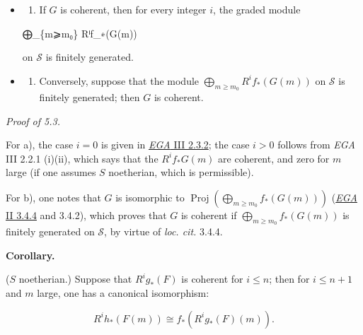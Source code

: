 \documentclass[
  11pt,
  a4paper,
]{book}
\newenvironment{Shaded}{}{}
\newcommand{\NormalTok}[1]{#1}
\providecommand{\tightlist}{%
  \setlength{\itemsep}{0pt}\setlength{\parskip}{0pt}}
\begin{document}
\begin{itemize}
\item
  \begin{enumerate}
  \def\labelenumi{\alph{enumi})}
  \tightlist
  \item
    If \(G\) is coherent, then for every integer \(i\), the graded
    module
  \end{enumerate}

\begin{Shaded}
\begin{Highlighting}[]
\NormalTok{⨁\_\{m⩾m₀\} Rⁱf\_∗(G(m))}
\end{Highlighting}
\end{Shaded}

  on \(\mathcal{S}\) is finitely generated.
\item
  \begin{enumerate}
  \def\labelenumi{\alph{enumi})}
  \setcounter{enumi}{1}
  \tightlist
  \item
    Conversely, suppose that the module
    \(\bigoplus_{m\geqslant m_{0}} R^{i}f_{\ast}(G(m))\) on
    \(\mathcal{S}\) is finitely generated; then \(G\) is coherent.
  \end{enumerate}
\end{itemize}

\emph{Proof of 5.3.}

For a), the case \(i = 0\) is given in
\href{https://jcreinhold.github.io/ega/iii/09-ch3-02-cohomology-projective-morphisms.html\#23-application-to-graded-sheaves-of-algebras-and-of-modules}{\emph{EGA}
III 2.3.2}; the case \(i > 0\) follows from \emph{EGA} III 2.2.1
(i)(ii), which says that the \(R^{i}f_{\ast} G(m)\) are coherent, and
zero for \(m\) large (if one assumes \(S\) noetherian, which is
permissible).

For b), one notes that \(G\) is isomorphic to
\(\operatorname{Proj}(\bigoplus_{m\geqslant m_{0}} f_{\ast}(G(m)))\)
(\href{https://jcreinhold.github.io/ega/ii/02-03-homogeneous-spectrum-sheaf-graded-algebras.html\#34-finiteness-conditions}{\emph{EGA}
II 3.4.4} and 3.4.2), which proves that \(G\) is coherent if
\(\bigoplus_{m\geqslant m_{0}} f_{\ast}(G(m))\) is finitely generated on
\(\mathcal{S}\), by virtue of \emph{loc. cit.} 3.4.4.

\textbf{Corollary.}

(\(S\) noetherian.) Suppose that \(R^{i}g_{\ast}(F)\) is coherent for
\(i \leqslant n\); then for \(i \leqslant n + 1\) and \(m\) large, one
has a canonical isomorphism:

\[ R^{i}h_{\ast}(F(m)) \cong f_{\ast}(R^{i}g_{\ast}(F)(m)). \]
\end{document}
